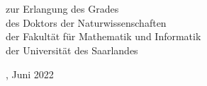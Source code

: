 \begin{titlepage}
    \begin{addmargin}[-1cm]{-3cm}
    \begin{center}
        \large

        \hfill

        \vfill

        \begingroup
            \color{CTtitle}\spacedallcaps{\myTitle} \\ \bigskip
        \endgroup

        \spacedlowsmallcaps{\myName}

        \vfill

	    \\
	    \bigskip
	    zur  Erlangung  des  Grades\\
	    des  Doktors  der Naturwissenschaften\\
	    der Fakultät für Mathematik und Informatik\\
	    der Universität des Saarlandes
        \bigskip

        \myLocation, Juni 2022

        \vfill

    \end{center}
  \end{addmargin}
\end{titlepage}
